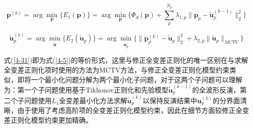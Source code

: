 \documentclass[12pt]{article}
\begin{document}
\begin{equation}\label{4-30}
\boldsymbol{p}^{(k)}=\arg\min_{\boldsymbol{p}}\{E_1(\boldsymbol{p})\}=\arg\min_{\boldsymbol{p}}
\{\Phi_d(\boldsymbol{p})+\sum_p^{N_p}\lambda_{1,p}\parallel \boldsymbol{p}_p-\tilde{\boldsymbol{u}}_p^{(k-1)}\parallel_{2}^{2}\}
\end{equation}
\par
\begin{equation}\label{4-31}
\tilde{\boldsymbol{u}}_p^{(k)}=\arg\min_{\tilde{\boldsymbol{u}}}\{E_2(\tilde{\boldsymbol{u}}_p)\}=\arg\min_{\tilde{\boldsymbol{u}}_p}\{\parallel \boldsymbol{p}_p^{(k)}-\tilde{\boldsymbol{u}}_p\parallel_2^2+\lambda_{2,p}\parallel\tilde{\boldsymbol{u}}_p\parallel_{MCTV}\}
\end{equation}
\par
式(\ref{4-31})即为式(\ref{4-5})的等价形式，这里与修正全变差正则化的唯一区别在与求解全变差正则化项时使用的方法为MCTV方法，与修正全变差正则化模型约束类似，即将一个最小化问题分解为两个最小化子问题，对于这两个子问题可以理解为：第一个子问题使用基于Tikhonov正则化和先验模型$\tilde{\boldsymbol{u}}_p^{(k-1)}$的全波形反演，第二个子问题使用$L_1$全变差最小化方法求解$\tilde{\boldsymbol{u}}_p^{(k)}$以保持反演结果中$\boldsymbol{u}_p^{(k)}$的分界面清晰，由于使用了考虑高阶项的全变差正则化模型约束，因此在细节方面较修正全变差正则化模型约束更加精确。
\end{document}
